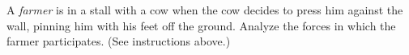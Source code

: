 A \emph{farmer} is in a stall with a cow when the cow
decides to press him against the wall, pinning him with his
feet off the ground. Analyze the forces in which the
farmer participates.
(See instructions above.)
